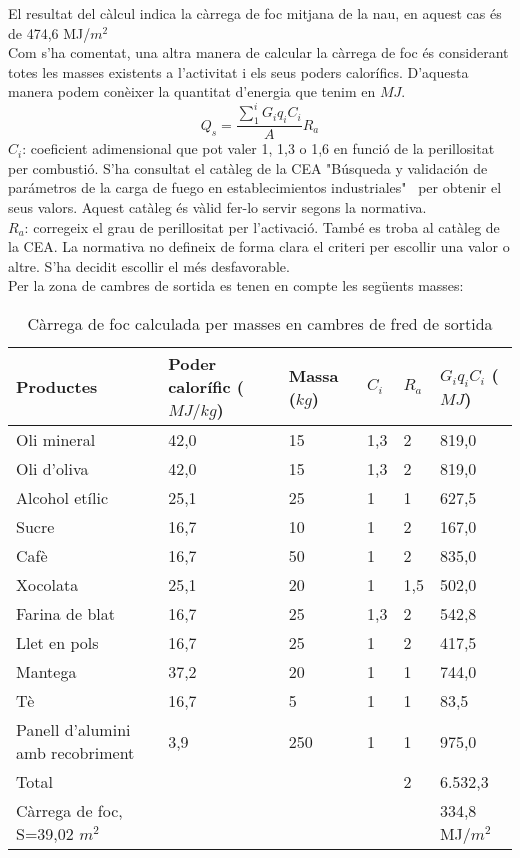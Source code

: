 \noindent El resultat del càlcul indica la càrrega de foc mitjana de la nau, en aquest cas és de 474,6 MJ/$m^2$  \\
%
%
%
%
%
%
%
%
\newline Com s'ha comentat, una altra manera de calcular la càrrega de foc és considerant totes les masses existents a l'activitat i els seus poders calorífics. D'aquesta manera podem conèixer la quantitat d'energia que tenim en $MJ$. 
\begin{equation}
Q_s = \frac{\sum_{1}^{i}G_iq_{i}C_i}{A}R_a
\end{equation}
\noindent $C_i$: coeficient adimensional que pot valer 1, 1,3 o 1,6 en funció de la perillositat per combustió. S'ha consultat el catàleg de la CEA "Búsqueda y validación de parámetros de la carga de fuego en establecimientos industriales" \ per obtenir el seus valors. Aquest catàleg és vàlid fer-lo servir segons la normativa.\\
$R_a$: corregeix el grau de perillositat per l'activació. També es troba al catàleg de la CEA. La normativa no defineix de forma clara el criteri per escollir una valor o altre. S'ha decidit escollir el més desfavorable.\\
\newline Per la zona de cambres de sortida es tenen en compte les següents masses:
\begin{table}[H]
\small
\begin{center}
 \begin{tabu} to \textwidth {|X[1.5, l]|X[r]|X[r]|X[r]|X[r]|X[r]|}%
 \hline
Productes & Poder calorífic ($MJ/kg$)& Massa ($kg$) & $C_i$ & $R_a$ & $G_iq_{i}C_i$ ($MJ$) \\
 \hline \hline 
Oli mineral & 42,0 & 15 & 1,3 & 2 & 819,0 \\ \hline
Oli d'oliva & 42,0 & 15 & 1,3 & 2 & 819,0 \\ \hline
Alcohol etílic & 25,1 & 25 & 1 & 1 & 627,5 \\ \hline
Sucre & 16,7 & 10 & 1 & 2 & 167,0 \\ \hline
Cafè & 16,7 & 50 & 1 & 2 & 835,0 \\ \hline
Xocolata & 25,1 & 20 & 1 & 1,5 & 502,0 \\ \hline
Farina de blat & 16,7 & 25 & 1,3 & 2 & 542,8 \\ \hline
Llet en pols & 16,7 & 25 & 1 & 2 & 417,5 \\ \hline
Mantega & 37,2 & 20 & 1 & 1 & 744,0 \\ \hline
Tè & 16,7 & 5 & 1 & 1 & 83,5 \\ \hline
Panell d'alumini amb recobriment & 3,9 & 250 & 1 & 1 & 975,0 \\ \hline \hline
Total & & & & 2 & 6.532,3 \\ \hline
Càrrega de foc, S=39,02 $m^2$ &  & 334,8 MJ/$m^2$ \\ \hline
 \end{tabu}
 \caption{Càrrega de foc calculada per masses en cambres de fred de sortida}
\end{center}
\end{table}

